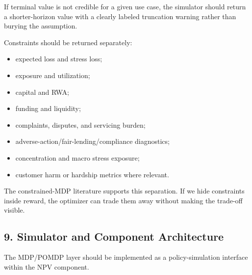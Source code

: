 \documentclass[
]{article}
\providecommand{\tightlist}{%
  \setlength{\itemsep}{0pt}\setlength{\parskip}{0pt}}
\begin{document}
If terminal value is not credible for a given use case, the simulator
should return a shorter-horizon value with a clearly labeled truncation
warning rather than burying the assumption.

Constraints should be returned separately:

\begin{itemize}
\tightlist
\item
  expected loss and stress loss;
\item
  exposure and utilization;
\item
  capital and RWA;
\item
  funding and liquidity;
\item
  complaints, disputes, and servicing burden;
\item
  adverse-action/fair-lending/compliance diagnostics;
\item
  concentration and macro stress exposure;
\item
  customer harm or hardship metrics where relevant.
\end{itemize}

The constrained-MDP literature supports this separation. If we hide
constraints inside reward, the optimizer can trade them away without
making the trade-off visible.

\hypertarget{simulator-and-component-architecture}{%
\subsection{9. Simulator and Component
Architecture}\label{simulator-and-component-architecture}}

The MDP/POMDP layer should be implemented as a policy-simulation
interface within the NPV component.
\end{document}
